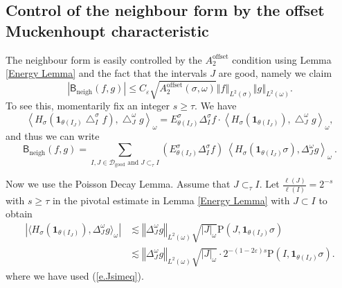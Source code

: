 \documentclass{amsart}%
\theoremstyle{plain}
\numberwithin{equation}{section}
\begin{document}
\subsection{Control of the neighbour form by the offset Muckenhoupt
characteristic}

The neighbour form is easily controlled by the $A_{2}^{\operatorname*{offset}%
}$ condition using Lemma \ref{Energy Lemma} and the fact that the intervals
$J$ are good, namely we claim%
\[
\left\vert \mathsf{B}_{\operatorname{neigh}}\left(  f,g\right)  \right\vert
\leq C_{\varepsilon}\sqrt{A_{2}^{\operatorname*{offset}}\left(  \sigma
,\omega\right)  }\left\Vert f\right\Vert _{L^{2}(\sigma)}\left\Vert
g\right\Vert _{L^{2}(\omega)}.
\]
To see this, momentarily fix an integer $s\geq\tau$. We have
\[
\left\langle H_{\sigma}\left(  \mathbf{1}_{\theta\left(  I_{J}\right)
}\bigtriangleup_{I}^{\sigma}f\right)  ,\bigtriangleup_{J}^{\omega
}g\right\rangle _{\omega}=E_{\theta\left(  I_{J}\right)  }^{\sigma}\Delta
_{I}^{\sigma}f\cdot\left\langle H_{\sigma}\left(  \mathbf{1}_{\theta\left(
I_{J}\right)  }\right)  ,\bigtriangleup_{J}^{\omega}g\right\rangle _{\omega},
\]
and thus we can write%
\begin{equation}
\mathsf{B}_{\operatorname{neigh}}\left(  f,g\right)  =\sum_{I,J\in
\mathcal{D}_{\operatorname{good}}\text{ and }J\subset_{\tau}I}\left(
E_{\theta\left(  I_{J}\right)  }^{\sigma}\Delta_{I}^{\sigma}f\right)
\ \left\langle H_{\sigma}\left(  \mathbf{1}_{\theta\left(  I_{J}\right)
}\sigma\right)  ,\Delta_{J}^{\omega}g\right\rangle _{\omega}%
\ .\label{neighbour term}%
\end{equation}


Now we use the Poisson Decay Lemma. Assume that $J\subset_{\tau}I$. Let
$\frac{\ell\left(  J\right)  }{\ell\left(  I\right)  }=2^{-s}$ with $s\geq
\tau$ in the pivotal estimate in Lemma \ref{Energy Lemma} with $J\subset I$ to
obtain
\begin{align*}
\left\vert \langle H_{\sigma}\left(  \mathbf{1}_{\theta\left(  I_{J}\right)
}\right)  ,\Delta_{J}^{\omega}g\rangle_{\omega}\right\vert  &  \lesssim
\left\Vert \Delta_{J}^{\omega}g\right\Vert _{L^{2}\left(  \omega\right)
}\sqrt{\left\vert J\right\vert _{\omega}}\mathrm{P}\left(  J,\mathbf{1}%
_{\theta\left(  I_{J}\right)  }\sigma\right) \\
&  \lesssim\left\Vert \Delta_{J}^{\omega}g\right\Vert _{L^{2}\left(
\omega\right)  }\sqrt{\left\vert J\right\vert _{\omega}}\cdot2^{-\left(
1-2\varepsilon\right)  s}\mathrm{P}\left(  I,\mathbf{1}_{\theta\left(
I_{J}\right)  }\sigma\right)  .
\end{align*}
where we have used (\ref{e.Jsimeq}).
\end{document}
